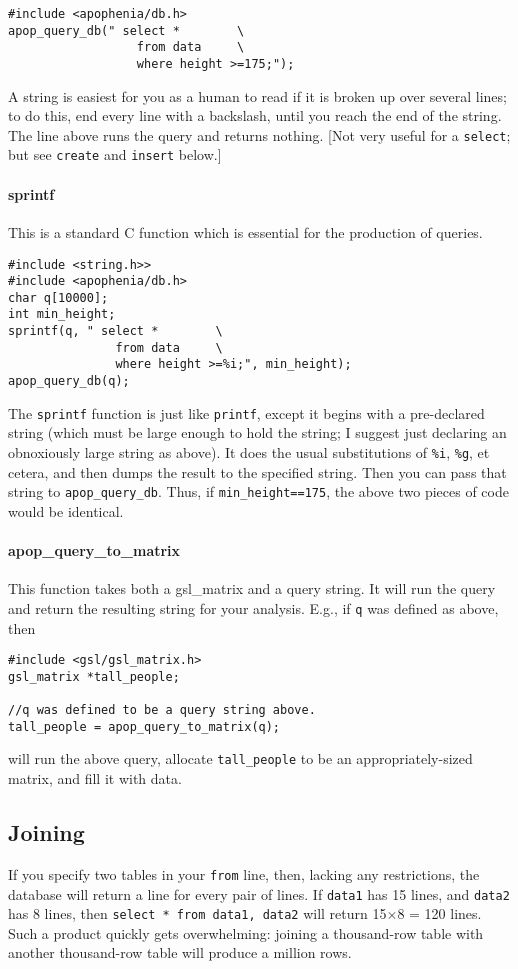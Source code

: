 \begin{verbatim}
#include <apophenia/db.h>
apop_query_db(" select *        \
                  from data     \
                  where height >=175;");
\end{verbatim}
A string is easiest for you as a human to read if it is
broken up over several lines; to do this, end every line with a
backslash, until you reach the end of the string. The line above runs
the query and returns nothing. [Not very useful for a {\tt select}; but see
{\tt create} and  {\tt insert} below.]

\paragraph{sprintf} This is a standard C function which is essential for
the production of queries. 
\begin{verbatim}
#include <string.h>>
#include <apophenia/db.h>
char q[10000];
int min_height;
sprintf(q, " select *        \
               from data     \
               where height >=%i;", min_height);
apop_query_db(q);
\end{verbatim}
The {\tt sprintf} function is just like {\tt printf}, except it begins
with a pre-declared string (which must be large enough to hold the
string; I suggest just declaring an obnoxiously large string as above).
It does the usual substitutions of {\tt \%i}, {\tt \%g}, et cetera, and
then dumps the result to the specified string. Then you can pass that
string to {\tt apop\_query\_db}. Thus, if {\tt min\_height==175}, the above
two pieces of code would be identical.

\paragraph{apop\_query\_to\_matrix} This function takes both a
gsl\_matrix and a query string. It will run the query and return the
resulting string for your analysis. E.g., if {\tt q} was defined as
above, then 
\begin{verbatim}
#include <gsl/gsl_matrix.h>
gsl_matrix *tall_people;

//q was defined to be a query string above.
tall_people = apop_query_to_matrix(q);
\end{verbatim}
will run the above query, allocate {\tt tall\_people} to be an
appropriately-sized matrix, and fill it with data.

\subsection{Joining}
If you specify two tables in your {\tt from} line, then, lacking any
restrictions, the database will return a line for every pair of lines.
If {\tt data1} has 15 lines, and {\tt data2} has 8 lines, then {\tt select *
from data1, data2} will return 15$\times$8 = 120 lines.  Such a product
quickly gets overwhelming: joining a thousand-row table with another
thousand-row table will produce a million rows.

